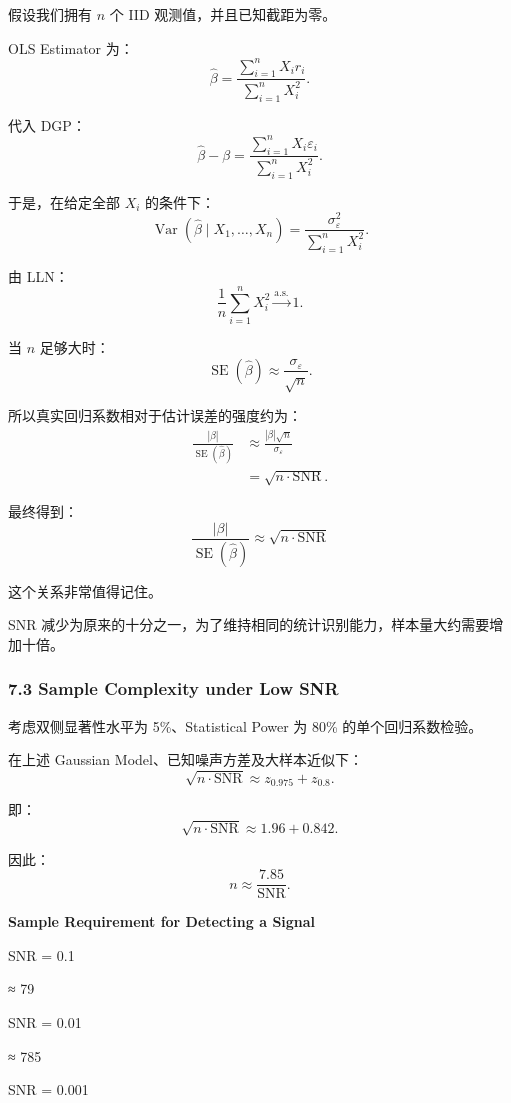 假设我们拥有 \(n\) 个 IID 观测值，并且已知截距为零。

OLS Estimator 为：
\[\hat\beta
=
\frac{\sum_{i=1}^nX_ir_i}
{\sum_{i=1}^nX_i^2}.\]

代入 DGP：
\[\hat\beta-\beta
=
\frac{\sum_{i=1}^nX_i\varepsilon_i}
{\sum_{i=1}^nX_i^2}.\]

于是，在给定全部 \(X_i\) 的条件下：
\[\operatorname{Var}(\hat\beta\mid X_1,\ldots,X_n)
=
\frac{\sigma_\varepsilon^2}
{\sum_{i=1}^nX_i^2}.\]

由 LLN：
\[\frac1n\sum_{i=1}^nX_i^2
\xrightarrow{\mathrm{a.s.}}1.\]

当 \(n\) 足够大时：
\[\operatorname{SE}(\hat\beta)
\approx
\frac{\sigma_\varepsilon}{\sqrt n}.\]

所以真实回归系数相对于估计误差的强度约为：
\[\begin{aligned}
\frac{|\beta|}{\operatorname{SE}(\hat\beta)}
&\approx
\frac{|\beta|\sqrt n}{\sigma_\varepsilon}\\
&=\sqrt{n\cdot\mathrm{SNR}}.
\end{aligned}\]

最终得到：
\[\boxed{
\frac{|\beta|}{\operatorname{SE}(\hat\beta)}
\approx
\sqrt{n\cdot\mathrm{SNR}}
}\]

这个关系非常值得记住。

SNR 减少为原来的十分之一，为了维持相同的统计识别能力，样本量大约需要增加十倍。

\hypertarget{part-4-60-0001-sample-complexity-under-low-snr}{%
\subsubsection{7.3 Sample Complexity under Low SNR}\label{part-4-60-0001-sample-complexity-under-low-snr}}

考虑双侧显著性水平为 5\%、Statistical Power 为 80\% 的单个回归系数检验。

在上述 Gaussian Model、已知噪声方差及大样本近似下：
\[\sqrt{n\cdot\mathrm{SNR}}
\approx
z_{0.975}+z_{0.8}.\]

即：
\[\sqrt{n\cdot\mathrm{SNR}}
\approx1.96+0.842.\]

因此：
\[\boxed{
n\approx\frac{7.85}{\mathrm{SNR}}.
}\]

\textbf{Sample Requirement for Detecting a Signal}

SNR = 0.1

≈ 79

SNR = 0.01

≈ 785

SNR = 0.001

